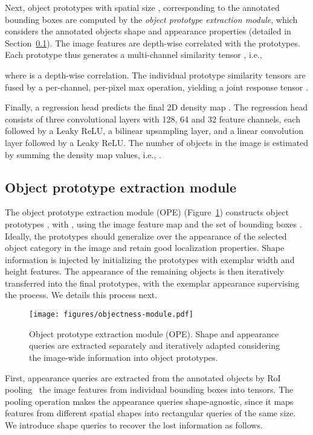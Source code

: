 \documentclass[10pt,twocolumn,letterpaper]{article}
\begin{document}
Next,  object prototypes  with spatial size , corresponding to the annotated bounding boxes are computed by the \textit{object prototype extraction module}, which considers the annotated objects shape and appearance properties (detailed in Section~\ref{sec:object_queries}). The image features  are depth-wise correlated with the prototypes. Each prototype thus generates a multi-channel similarity tensor , i.e.,

where  is a depth-wise correlation. The individual  prototype similarity tensors are fused by a per-channel, per-pixel max operation, yielding a joint response tensor
. 

Finally, a regression head predicts the final 2D density map . The regression head consists of three  convolutional layers with 128, 64 and 32 feature channels, each followed by a Leaky ReLU, a  bilinear upsampling layer, and a linear  convolution layer followed by a Leaky ReLU. The number of objects in the image  is estimated by summing the density map values, i.e., .

\subsection{Object prototype extraction module}\label{sec:object_queries}

The object prototype extraction module (OPE) (Figure~\ref{fig:objectness}) constructs  object prototypes 
, with , using the image feature map  and the set of  bounding boxes . 
Ideally, the prototypes should generalize over the appearance of the selected object category in the image and retain good localization properties. 
Shape information is injected by initializing the prototypes with exemplar width and height features. The appearance of the remaining objects is then iteratively transferred into the final prototypes, with the exemplar appearance supervising the process. We details this process next.



\begin{figure}[!h]
    \centering
    \texttt{[image: figures/objectness-module.pdf]}
    \caption{Object prototype extraction module (OPE). Shape and appearance queries are extracted separately and iteratively adapted considering the image-wide information into  object prototypes.
    }
    \label{fig:objectness}
\end{figure}

First,  appearance queries  are extracted from the annotated objects by RoI pooling~\cite{maskrcnn} the image features  from individual bounding boxes  into   tensors.
The pooling operation makes the appearance queries shape-agnostic, since it maps features from different spatial shapes into rectangular queries of the same size.
We introduce shape queries  to recover the lost information as follows. 
\end{document}
